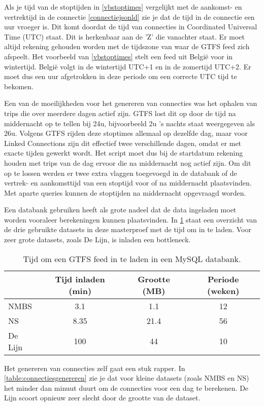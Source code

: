 Als je tijd van de stoptijden in \ref{vbstoptimes} vergelijkt met de aankomst- en vertrektijd in de connectie \ref{connectiejsonld} zie je dat de tijd in de connectie een uur vroeger is. Dit komt doordat de tijd van connecties in Coordinated Universal Time (UTC) staat. Dit is herkenbaar aan de 'Z' die vanachter staat. Er moet altijd rekening gehouden worden met de tijdszone van waar de GTFS feed zich afspeelt. Het voorbeeld van \ref{vbstoptimes} stelt een feed uit Belgi\"e voor in wintertijd. Belgi\"e volgt in de wintertijd UTC+1 en in de zomertijd UTC+2. Er moet dus een uur afgetrokken in deze periode om een correcte UTC tijd te bekomen.

Een van de moeilijkheden voor het genereren van connecties was het ophalen van trips die over meerdere dagen actief zijn. GTFS lost dit op door de tijd na middernacht op te tellen bij 24u, bijvoorbeeld 2u 's nachts staat weergegeven als 26u. Volgens GTFS rijden deze stoptimes allemaal op dezelfde dag, maar voor Linked Connections zijn dit effectief twee verschillende dagen, omdat er met exacte tijden gewerkt wordt. Het script moet dus bij de startdatum rekening houden met trips van de dag ervoor die na middernacht nog actief zijn.
Om dit op te lossen werden er twee extra vlaggen toegevoegd in de databank of de vertrek- en aankomsttijd van een stoptijd voor of na middernacht plaatsvinden. Met aparte queries kunnen de stoptijden na middernacht opgevraagd worden.

Een databank gebruiken heeft als grote nadeel dat de data ingeladen moet worden vooraleer berekeningen kunnen plaatsvinden. In \ref{table:inladengtfs} staat een overzicht van de drie gebruikte datasets in deze masterproef met de tijd om in te laden. Voor zeer grote datasets, zoals De Lijn, is inladen een bottleneck.

\begin{table}[htbp]
\centering
\begin{tabular}{ | l || c | c | c |}
  \hline			
    & Tijd inladen (min) & Grootte (MB) & Periode (weken) \\ \hline
  NMBS & 3.1 & 1.1 & 12  \\
  NS & 8.35 & 21.4 & 56 \\
  De Lijn & 100 & 44 & 10 \\
  \hline  
\end{tabular}
\caption{Tijd om een GTFS feed in te laden in een MySQL databank.}
\label{table:inladengtfs}
\end{table}

Het genereren van connecties zelf gaat een stuk rapper. In \ref{table:connectiesgenereren} zie je dat voor kleine datasets (zoals NMBS en NS) het minder dan minuut duurt om de connecties voor een dag te berekenen. De Lijn scoort opnieuw zeer slecht door de grootte van de dataset.

